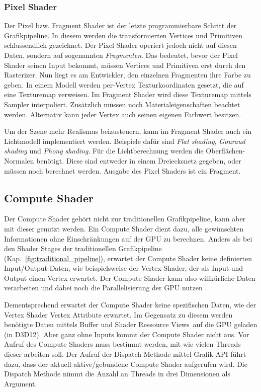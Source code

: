 \subsubsection{Pixel Shader}
\label{subsubsec:pixel_shader}
Der Pixel bzw. Fragment Shader ist der letzte programmierbare Schritt der Grafikpipeline.
In diesem werden die transformierten Vertices und Primitiven schlussendlich gezeichnet.
Der Pixel Shader operiert jedoch nicht auf diesen Daten, sondern auf sogenannten \textit{Fragmenten}.
Das bedeutet, bevor der Pixel Shader seinen Input bekommt, müssen Vertices und Primitiven erst durch den Rasterizer.
Nun liegt es am Entwickler, den einzelnen Fragmenten ihre Farbe zu geben.
In einem Modell werden per-Vertex Texturkoordinaten gesetzt, die auf eine Texturemap verweisen.
Im Fragment Shader wird diese Texturemap mittels Sampler interpoliert.
Zusätzlich müssen noch Materialeigenschaften beachtet werden.
Alternativ kann jeder Vertex auch seinen eigenen Farbwert besitzen. \newline

Um der Szene mehr Realismus beizusteuern, kann im Fragment Shader auch ein Lichtmodell implementiert werden.
Beispiele dafür sind \textit{Flat shading}, \textit{Gouraud shading} und \textit{Phong shading}.
Für die Lichtberechnung werden die Oberflächen-Normalen benötigt.
Diese sind entweder in einem Dreiecksnetz gegeben, oder müssen noch berechnet werden.
Ausgabe des Pixel Shaders ist ein Fragment.

\subsection{Compute Shader}
\label{subsec:compute_shader}
Der Compute Shader gehört nicht zur traditionellen Grafikpipeline, kann aber mit dieser genutzt werden.
Ein Compute Shader dient dazu, alle gewünschten Informationen ohne Einschränkungen auf der GPU zu berechnen.
Anders als bei den Shader Stages der traditionellen Grafikpipeline (Kap.~\ref{fig:traditional_pipeline}), erwartet der Compute Shader keine definierten Input/Output Daten, wie beispielsweise der Vertex Shader, der als Input und Output einen Vertex erwartet.
Der Compute Shader kann also willkürliche Daten verarbeiten und dabei noch die Parallelisierung der GPU nutzen \cite{Compute24}. \newline

Dementsprechend erwartet der Compute Shader keine spezifischen Daten, wie der Vertex Shader Vertex Attribute erwartet.
Im Gegensatz zu diesem werden benötigte Daten mittels Buffer und \glqq Shader Ressource Views\grqq\ auf die GPU geladen (in D3D12).
Aber ganz ohne Inputs kommt der Compute Shader nicht aus.
Vor Aufruf des Compute Shaders muss bestimmt werden, mit wie vielen Threads dieser arbeiten soll.
Der Aufruf der Dispatch Methode mittel Grafik API führt dazu, dass der aktuell aktive/gebundene Compute Shader aufgerufen wird.
Die Dispatch Methode nimmt die Anzahl an Threads in drei Dimensionen als Argument.

